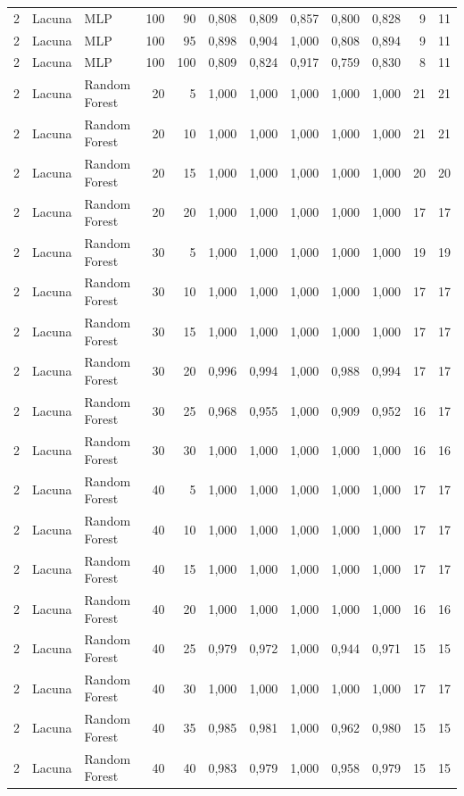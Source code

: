 \begin{longtable}{@{}rllrrrrrrrrr@{}}
2 & Lacuna & MLP & 100 & 90 & 0,808 & 0,809 & 0,857 & 0,800 & 0,828 & 9 & 11 \\
2 & Lacuna & MLP & 100 & 95 & 0,898 & 0,904 & 1,000 & 0,808 & 0,894 & 9 & 11 \\
2 & Lacuna & MLP & 100 & 100 & 0,809 & 0,824 & 0,917 & 0,759 & 0,830 & 8 & 11 \\
2 & Lacuna & Random Forest & 20 & 5 & 1,000 & 1,000 & 1,000 & 1,000 & 1,000 & 21 & 21 \\
2 & Lacuna & Random Forest & 20 & 10 & 1,000 & 1,000 & 1,000 & 1,000 & 1,000 & 21 & 21 \\
2 & Lacuna & Random Forest & 20 & 15 & 1,000 & 1,000 & 1,000 & 1,000 & 1,000 & 20 & 20 \\
2 & Lacuna & Random Forest & 20 & 20 & 1,000 & 1,000 & 1,000 & 1,000 & 1,000 & 17 & 17 \\
2 & Lacuna & Random Forest & 30 & 5 & 1,000 & 1,000 & 1,000 & 1,000 & 1,000 & 19 & 19 \\
2 & Lacuna & Random Forest & 30 & 10 & 1,000 & 1,000 & 1,000 & 1,000 & 1,000 & 17 & 17 \\
2 & Lacuna & Random Forest & 30 & 15 & 1,000 & 1,000 & 1,000 & 1,000 & 1,000 & 17 & 17 \\
2 & Lacuna & Random Forest & 30 & 20 & 0,996 & 0,994 & 1,000 & 0,988 & 0,994 & 17 & 17 \\
2 & Lacuna & Random Forest & 30 & 25 & 0,968 & 0,955 & 1,000 & 0,909 & 0,952 & 16 & 17 \\
2 & Lacuna & Random Forest & 30 & 30 & 1,000 & 1,000 & 1,000 & 1,000 & 1,000 & 16 & 16 \\
2 & Lacuna & Random Forest & 40 & 5 & 1,000 & 1,000 & 1,000 & 1,000 & 1,000 & 17 & 17 \\
2 & Lacuna & Random Forest & 40 & 10 & 1,000 & 1,000 & 1,000 & 1,000 & 1,000 & 17 & 17 \\
2 & Lacuna & Random Forest & 40 & 15 & 1,000 & 1,000 & 1,000 & 1,000 & 1,000 & 17 & 17 \\
2 & Lacuna & Random Forest & 40 & 20 & 1,000 & 1,000 & 1,000 & 1,000 & 1,000 & 16 & 16 \\
2 & Lacuna & Random Forest & 40 & 25 & 0,979 & 0,972 & 1,000 & 0,944 & 0,971 & 15 & 15 \\
2 & Lacuna & Random Forest & 40 & 30 & 1,000 & 1,000 & 1,000 & 1,000 & 1,000 & 17 & 17 \\
2 & Lacuna & Random Forest & 40 & 35 & 0,985 & 0,981 & 1,000 & 0,962 & 0,980 & 15 & 15 \\
2 & Lacuna & Random Forest & 40 & 40 & 0,983 & 0,979 & 1,000 & 0,958 & 0,979 & 15 & 15 \\

\end{longtable}
